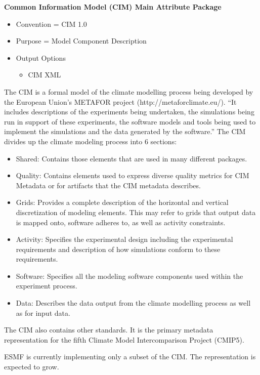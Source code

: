 {\bf Common Information Model (CIM) Main Attribute Package}

\begin{itemize}
    \item Convention = CIM 1.0
    \item Purpose = Model Component Description
    \item Output Options
    \begin{itemize}
        \item CIM XML
    \end{itemize}  
\end{itemize}

The CIM is a formal model of the climate modelling process being developed by the European Union's METAFOR project (http://metaforclimate.eu/). ``It includes descriptions of the experiments being undertaken, the simulations being run in support of these experiments, the software models and tools being used to implement the simulations and the data generated by the software.'' The CIM divides up the climate modeling process into 6 sections:
 
\begin{itemize}
    \item Shared: Contains those elements that are used in many different packages. 
    \item Quality: Contains elements used to express diverse quality metrics for CIM Metadata or for artifacts that the CIM metadata describes.
    \item Grids: Provides a complete description of the horizontal and vertical discretization of modeling elements. This may refer to grids that output data is mapped onto, software adheres to, as well as activity constraints. 
    \item Activity: Specifies the experimental design including the experimental requirements and description of how simulations conform to these requirements.
    \item Software: Specifies all the modeling software components used within the experiment process. 
    \item Data: Describes the data output from the climate modelling process as well as for input data. 
\end{itemize}

The CIM also contains other standards. It is the primary metadata representation for the fifth Climate Model Intercomparison Project (CMIP5). 

ESMF is currently implementing only a subset of the CIM. The representation is expected to grow.  

